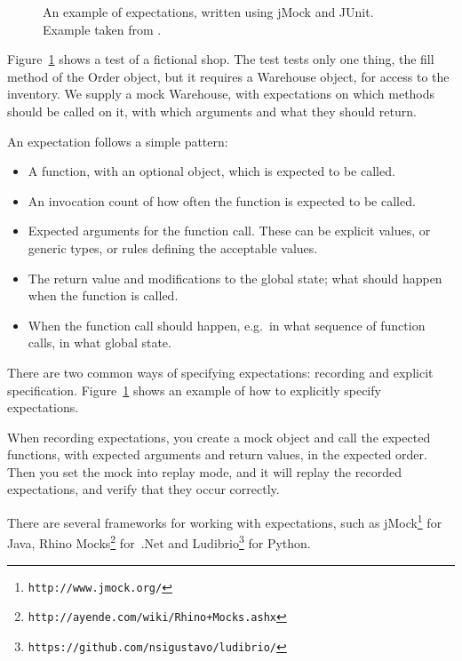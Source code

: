 \documentclass[a4paper,11pt]{kth-mag}
\theoremstyle{definition}
\begin{document}
\begin{figure}[h!]
	\begin{center}
	\begin{minipage}{0.9\textwidth}
		\lstset{language=Java}
		
	\end{minipage}
	\end{center}

	\caption{An example of expectations, written using jMock and JUnit.
	Example taken from \cite{fowler07expectations}.}
	\label{figure-expectations}
\end{figure}

Figure~\ref{figure-expectations} shows a test of a fictional shop. The test
tests only one thing, the fill method of the Order object, but it requires a
Warehouse object, for access to the inventory. We supply a mock Warehouse, with
expectations on which methods should be called on it, with which arguments and
what they should return.

An expectation follows a simple pattern:

\begin{itemize}
	\item A function, with an optional object, which is expected to be called.
	\item An invocation count of how often the function is expected to be called.
	\item Expected arguments for the function call. These can be explicit values,
		or generic types, or rules defining the acceptable values.
	\item The return value and modifications to the global state; what should
		happen when the function is called.
	\item When the function call should happen, e.g.\ in what sequence of
		function calls, in what global state.
\end{itemize}

There are two common ways of specifying expectations: recording and explicit
specification. Figure~\ref{figure-expectations} shows an example of how to
explicitly specify expectations.

When recording expectations, you create a mock object and call the expected
functions, with expected arguments and return values, in the expected order.
Then you set the mock into replay mode, and it will replay the recorded
expectations, and verify that they occur correctly.

There are several frameworks for working with expectations, such as
jMock\footnote{\texttt{http://www.jmock.org/}} for Java, Rhino
Mocks\footnote{\texttt{http://ayende.com/wiki/Rhino+Mocks.ashx}} for~.Net and
Ludibrio\footnote{\texttt{https://github.com/nsigustavo/ludibrio/}} for Python.
\end{document}
